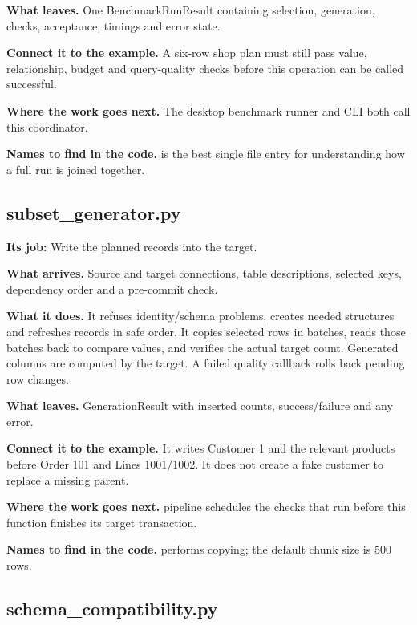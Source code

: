 \textbf{What leaves.} One BenchmarkRunResult containing selection, generation, checks, acceptance, timings and error state.

\textbf{Connect it to the example.} A six-row shop plan must still pass value, relationship, budget and query-quality checks before this operation can be called successful.

\textbf{Where the work goes next.} The desktop benchmark runner and CLI both call this coordinator.

\textbf{Names to find in the code.}  is the best single file entry for understanding how a full run is joined together.


\subsection{subset\_generator.py}

\textbf{Its job:} Write the planned records into the target.

\textbf{What arrives.} Source and target connections, table descriptions, selected keys, dependency order and a pre-commit check.

\textbf{What it does.} It refuses identity/schema problems, creates needed structures and refreshes records in safe order. It copies selected rows in batches, reads those batches back to compare values, and verifies the actual target count. Generated columns are computed by the target. A failed quality callback rolls back pending row changes.

\textbf{What leaves.} GenerationResult with inserted counts, success/failure and any error.

\textbf{Connect it to the example.} It writes Customer 1 and the relevant products before Order 101 and Lines 1001/1002. It does not create a fake customer to replace a missing parent.

\textbf{Where the work goes next.} pipeline schedules the checks that run before this function finishes its target transaction.

\textbf{Names to find in the code.}  performs copying; the default chunk size is 500 rows.


\subsection{schema\_compatibility.py}

